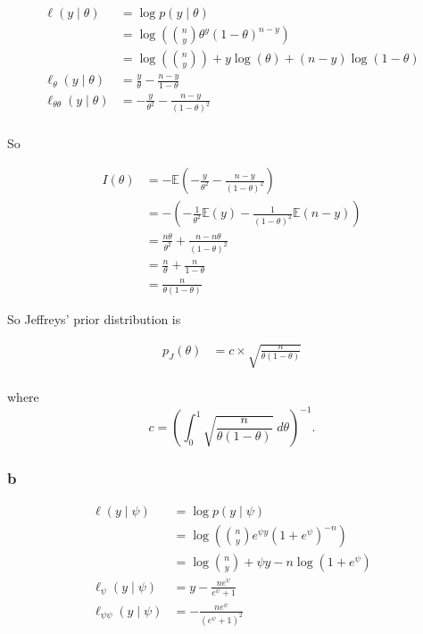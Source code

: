 \documentclass[
]{article}
\begin{document}
\begin{align}
\ell(y \mid \theta) &= \log p(y \mid \theta) \\
&= \log \left( {n \choose y} \theta^y (1 - \theta)^{n - y} \right) \\
&= \log \left( {n \choose y} \right) + y \log(\theta) + (n - y) \log(1 - \theta) \\
\ell_\theta(y \mid \theta) &= \frac{y}{\theta}- \frac{n - y}{1 - \theta} \\
\ell_{\theta \theta}(y \mid \theta) &= - \frac{y}{\theta^2} - \frac{n - y}{(1 - \theta)^2} \\
\end{align}

So

\begin{align}
I(\theta) &= -\mathbb{E}\left( -\frac{y}{\theta^2} - \frac{n - y}{(1 - \theta)^2} \right) \\
&= - \left( -\frac{1}{\theta^2} \mathbb{E}(y) - \frac{1}{(1 - \theta)^2} \mathbb{E}(n - y) \right) \\
&= \frac{n\theta}{\theta^2} + \frac{n - n\theta}{(1 - \theta)^2} \\
&= \frac{n}{\theta} + \frac{n}{1 - \theta} \\
&= \frac{n}{\theta (1 - \theta)}
\end{align}

So Jeffreys' prior distribution is

\begin{align}
p_J(\theta) &= c \times \sqrt{\frac{n}{\theta (1 - \theta)}} \\
\end{align}

where \[
c = \left( \int_0^1 \sqrt{\frac{n}{\theta(1 - \theta)}} \; d\theta \right)^{-1}.
\]

\hypertarget{b-6}{%
\subsubsection{b}\label{b-6}}

\begin{align}
\ell(y \mid \psi) &= \log p(y \mid \psi) \\
&= \log \left( {n \choose y} e^{\psi y} (1 + e^\psi)^{-n} \right) \\
&= \log {n \choose y} + \psi y - n \log \left(1 + e^\psi \right) \\
\ell_\psi(y \mid \psi) &= y - \frac{n e^\psi}{e^\psi + 1} \\
\ell_{\psi \psi}(y \mid \psi) &= - \frac{n e^\psi}{\left( e^\psi + 1 \right)^2}
\end{align}
\end{document}
